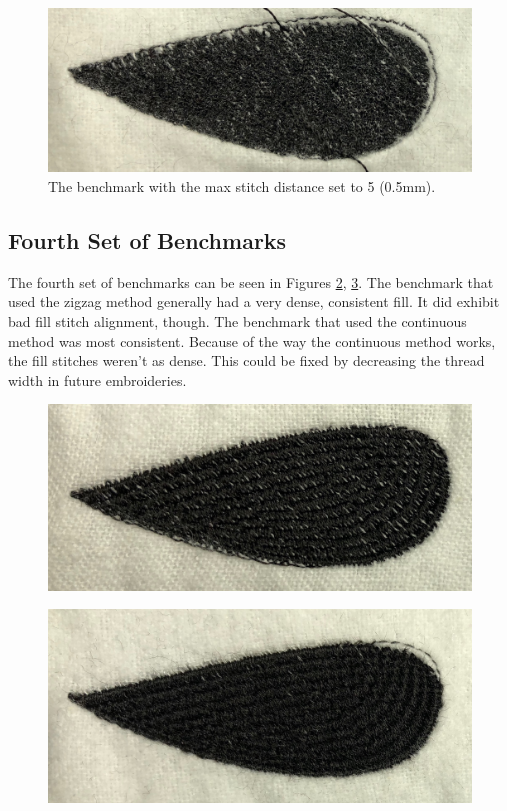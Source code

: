 \documentclass{article}
\begin{document}
\begin{figure}[H]
    \centering
    \includegraphics[width=4.7in]{5m}
    \caption{The benchmark with the max stitch distance set to 5 (0.5mm).}
    \label{5m}
\end{figure}

\subsection{Fourth Set of Benchmarks}

The fourth set of benchmarks can be seen in Figures \ref{StitchModeClosest_w2_5_d20}, \ref{StitchModeZigzag_w2_5_d20}. The benchmark that used the zigzag method generally had a very dense, consistent fill. It did exhibit bad fill stitch alignment, though. The benchmark that used the continuous method was most consistent. Because of the way the continuous method works, the fill stitches weren't as dense. This could be fixed by decreasing the thread width in future embroideries.

\begin{figure}[H]
    \centering
    \includegraphics[width=4.7in]{StitchModeClosest_w2_5_d20}
    \caption{}
    \label{StitchModeClosest_w2_5_d20}
\end{figure}

\begin{figure}[H]
    \centering
    \includegraphics[width=4.7in]{StitchModeZigzag_w2_5_d20}
    \caption{}
    \label{StitchModeZigzag_w2_5_d20}
\end{figure}
\end{document}
